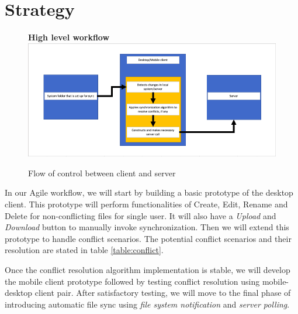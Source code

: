 \section{Strategy}
\begin{figure}[H]
	\centering
	\textbf{High level workflow}
	\includegraphics[width=\linewidth]{images/1.png}
	\caption{Flow of control between client and server}
\end{figure}\par
In our Agile workflow, we will start by building a basic prototype of the desktop client. This prototype will perform functionalities of Create, Edit, Rename and Delete for non-conflicting files for single user. It will also have a \emph{Upload} and \emph{Download} button to manually invoke synchronization. Then we will extend this prototype to handle conflict scenarios. The potential conflict scenarios and their resolution are stated in table \ref{table:conflict}.

Once the conflict resolution algorithm implementation is stable, we will develop the mobile client prototype followed by testing conflict resolution using mobile-desktop client pair. After satisfactory testing, we will move to the final phase of introducing automatic file sync using \emph{file system notification} and \emph{server polling}.

